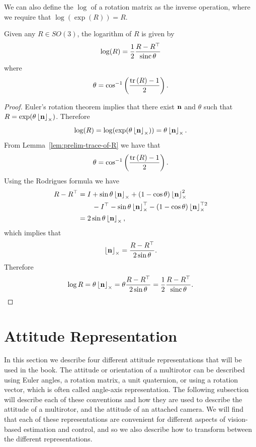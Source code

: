 We can also define the $\log$ of a rotation matrix as the inverse operation, where we require that $\log(\exp(R))=R$.
\begin{lemma}\label{lem:matrix_log}
Given any $R\in SO(3)$, the logarithm of $R$ is given by
\[
\log(R) = \frac{1}{2}\frac{R-R^\top}{\operatorname{sinc}{\theta}}
\]
where
\[
\theta = \cos^{-1}\left(\frac{\text{tr}\left(R\right)-1}{2}\right).
\]
\end{lemma}
\begin{proof}
Euler's rotation theorem implies that there exist $\mathbf{n}$ and $\theta$ such that $R=\exp(\theta\left\lfloor\mathbf{n}\right\rfloor_{\times})$.  Therefore
\[
\log(R) = \log(\exp(\theta\left\lfloor\mathbf{n}\right\rfloor_{\times}))=\theta\left\lfloor\mathbf{n}\right\rfloor_{\times}.
\]
From Lemma~\ref{lem:prelim-trace-of-R} we have that
\[
\theta = \cos^{-1}\left(\frac{\text{tr}\left(R\right)-1}{2}\right).
\]
Using the Rodrigues formula we have
\begin{align*}
R - R^\top &= I + \sin\theta \left\lfloor\mathbf{n}\right\rfloor_{\times} + (1-\cos\theta)\left\lfloor\mathbf{n}\right\rfloor_{\times}^2 \\
		   &\qquad - I^\top - \sin\theta\left\lfloor\mathbf{n}\right\rfloor_{\times}^\top - (1-\cos\theta)\left\lfloor\mathbf{n}\right\rfloor_{\times}^{\top 2} \\
           &= 2\sin\theta \left\lfloor\mathbf{n}\right\rfloor_{\times},
\end{align*}
which implies that 
\[
\left\lfloor\mathbf{n}\right\rfloor_{\times} = \frac{R-R^\top}{2\sin\theta}.
\]
Therefore
\[
\log{R} = \theta\left\lfloor\mathbf{n}\right\rfloor_{\times} = \theta\frac{R-R^\top}{2\sin\theta} = \frac{1}{2}\frac{R-R^\top}{\operatorname{sinc}{\theta}}.
\]
%
\end{proof}


\section{Attitude Representation}
\label{sec:attitude_representation}

In this section we describe four different attitude representations that will be used in the book.  The attitude or orientation of a multirotor can be described using Euler angles, a rotation matrix, a unit quaternion, or using a rotation vector, which is often called angle-axis representation.  The following subsection will describe each of these conventions and how they are used to describe the attitude of a multirotor, and the attitude of an attached camera.  We will find that each of these representations are convenient for different aspects of vision-based estimation and control, and so we also describe how to transform between the different representations.

